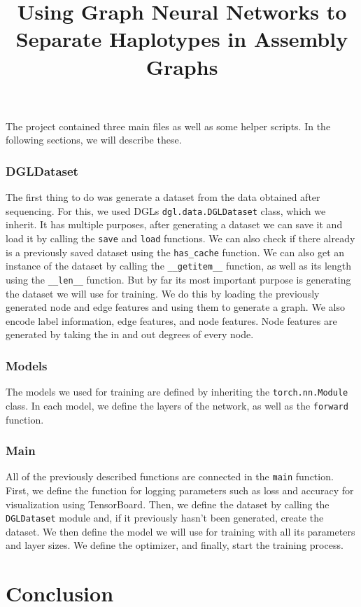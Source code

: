 \documentclass[times, utf8, diplomski, english]{fer_eng}
\begin{document}
The project contained three main files as well as some helper scripts. In the following sections, we will describe these.

\subsection{DGLDataset}

The first thing to do was generate a dataset from the data obtained after sequencing. For this, we used DGLs \texttt{dgl.data.DGLDataset} class, which we inherit. It has multiple purposes, after generating a dataset we can save it and load it by calling the \texttt{save} and \texttt{load} functions. We can also check if there already is a previously saved dataset using the \texttt{has\_cache} function. We can also get an instance of the dataset by calling the \texttt{\_\_getitem\_\_} function, as well as its length using the \texttt{\_\_len\_\_} function. But by far its most important purpose is generating the dataset we will use for training. We do this by loading the previously generated node and edge features and using them to generate a graph. We also encode label information, edge features, and node features. Node features are generated by taking the in and out degrees of every node.

\subsection{Models}

The models we used for training are defined by inheriting the \texttt{torch.nn.Module} class. In each model, we define the layers of the network, as well as the \texttt{forward} function.

\subsection{Main}

All of the previously described functions are connected in the \texttt{main} function. First, we define the function for logging parameters such as loss and accuracy for visualization using TensorBoard. Then, we define the dataset by calling the \texttt{DGLDataset} module and, if it previously hasn't been generated, create the dataset. We then define the model we will use for training with all its parameters and layer sizes. We define the optimizer, and finally, start the training process.

\chapter{Conclusion}




\clearpage

\title{Using Graph Neural Networks to Separate Haplotypes in Assembly Graphs}
\begin{abstract}

\keywords{}
\end{abstract}

\hrtitle{}
\begin{sazetak}

\kljucnerijeci{}
\end{sazetak}
\end{document}
